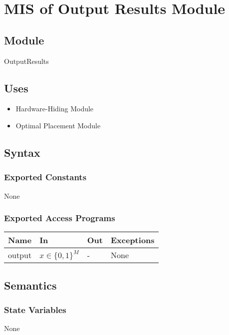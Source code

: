 \documentclass[12pt, titlepage]{article}
\begin{document}
\newpage

\section{MIS of Output Results Module} \label{MISResults}

\subsection{Module}
OutputResults 

\subsection{Uses}
\begin{itemize}
  \item Hardware-Hiding Module
  \item Optimal Placement Module 
\end{itemize}

\subsection{Syntax}

\subsubsection{Exported Constants}
None 

\subsubsection{Exported Access Programs}
\begin{center}
\begin{tabular}{p{3cm} p{4cm} p{4cm} p{3cm}}
\hline
\textbf{Name} & \textbf{In} & \textbf{Out} & \textbf{Exceptions} \\
\hline
output & $x \in \{0,1\}^M$  & - & None \\
\hline
\end{tabular}
\end{center}

\subsection{Semantics}

\subsubsection{State Variables}
None
\end{document}
